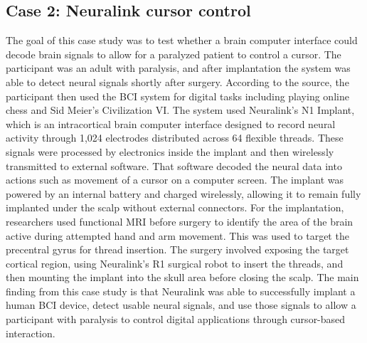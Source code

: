 \documentclass[11pt]{article}
\begin{document}
\subsection*{Case 2: Neuralink cursor control \cite{neuralink2024prime}}
The goal of this case study was to test whether a brain computer interface
could decode brain signals to allow for a paralyzed patient to control a
cursor. The participant was an adult with paralysis, and after implantation the
system was able to detect neural signals shortly after surgery. According to
the source, the participant then used the BCI system for digital tasks
including playing online chess and Sid Meier's Civilization VI. The system used
Neuralink's N1 Implant, which is an intracortical brain computer interface
designed to record neural activity through 1{,}024 electrodes distributed across
64 flexible threads. These signals were processed by electronics inside the
implant and then wirelessly transmitted to external software. That software
decoded the neural data into actions such as movement of a cursor on a computer
screen. The implant was powered by an internal battery and charged wirelessly,
allowing it to remain fully implanted under the scalp without external
connectors. For the implantation, researchers used functional MRI before
surgery to identify the area of the brain active during attempted hand and arm
movement. This was used to target the precentral gyrus for thread insertion.
The surgery involved exposing the target cortical region, using Neuralink's R1
surgical robot to insert the threads, and then mounting the implant into the
skull area before closing the scalp. The main finding from this case study is
that Neuralink was able to successfully implant a human BCI device, detect
usable neural signals, and use those signals to allow a participant with
paralysis to control digital applications through cursor-based interaction.
\end{document}
